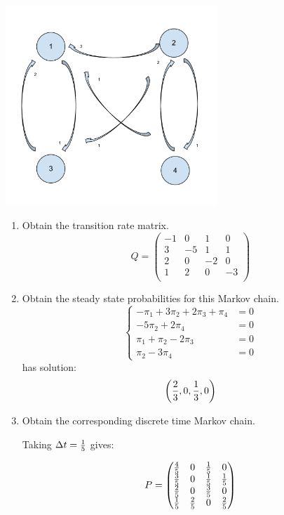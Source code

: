 \documentclass[12pt]{article}
\begin{document}
\begin{enumerate}
\begin{center}
\includegraphics[width=8cm]{Markov_Chains_Ex_5.pdf}
\end{center}



\begin{enumerate}
	\item Obtain the transition rate matrix.
$$Q=\begin{pmatrix}
-1&0&1&0\\
3&-5&1&1\\
2&0&-2&0\\
1&2&0&-3\\
\end{pmatrix}$$

	\item Obtain the steady state probabilities for this Markov chain.
$$
\begin{cases}
-\pi_1+3\pi_2+2\pi_3+\pi_4&=0\\
-5\pi_2+2\pi_4&=0\\
\pi_1+\pi_2-2\pi_3&=0\\
\pi_2-3\pi_4&=0
\end{cases}
$$
has solution:
$$\left({2\over3},0,{1\over3},0\right)$$

	\item Obtain the corresponding discrete time Markov chain.

Taking $\Delta t={1\over 5}$ gives:

$$P=\begin{pmatrix}
{4\over5}&0&{1\over5}&0\\
{3\over5}&0&{1\over5}&{1\over5}\\
{2\over 5}&0&{3\over5}&0\\
{1\over 5}&{2\over5}&0&{2\over 5}\\
\end{pmatrix}$$



\end{enumerate}
\end{enumerate}
\end{document}
